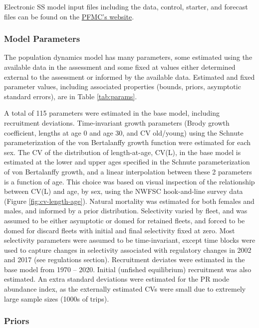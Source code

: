 \documentclass[
  english,
  a4paper,
]{article}
\begin{document}
Electronic SS model input files including the data, control, starter, and forecast files can be
found on the
\href{https://www.pcouncil.org/groundfish/stock-assessments/}{PFMC's website}.

\hypertarget{model-parameters}{%
\subsubsection{Model Parameters}\label{model-parameters}}

The population dynamics model has many parameters, some estimated using the available data in the assessment and some fixed at values either determined external to the assessment or informed by the available data. Estimated and fixed parameter values, including associated properties (bounds, priors, asymptotic standard errors), are in Table \ref{tab:params}.

A total of 115 parameters were estimated in the base model, including recruitment deviations. Time-invariant growth parameters (Brody growth coefficient, lengths at age 0 and age 30, and CV old/young) using the Schnute parameterization of the von Bertalanffy growth function were estimated for each sex. The CV of the distribution of length-at-age, CV(L), in the base model is estimated at the lower and upper ages specified in the Schnute parameterization of von Bertalanffy growth, and a linear interpolation between these 2 parameters is a function of age. This choice was based on visual inspection of the relationship between CV(L) and age, by sex, using the NWFSC hook-and-line survey data (Figure \ref{fig:cv-length-age}). Natural mortality was estimated for both females and males, and informed by a prior distribution. Selectivity varied by fleet, and was assumed to be either asymptotic or domed for retained fleets, and forced to be domed for discard fleets with initial and final selectivity fixed at zero. Most selectivity parameters were assumed to be time-invariant, except time blocks were used to capture changes in selectivity associated with regulatory changes in 2002 and 2017 (see regulations section). Recruitment deviates were estimated in the base model from 1970 -- 2020. Initial (unfished equilibrium) recruitment was also estimated. An extra standard deviations were estimated for the PR mode abundance index, as the externally estimated CVs were small due to extremely large sample sizes (1000s of trips).

\hypertarget{priors}{%
\subsubsection{Priors}\label{priors}}
\end{document}
